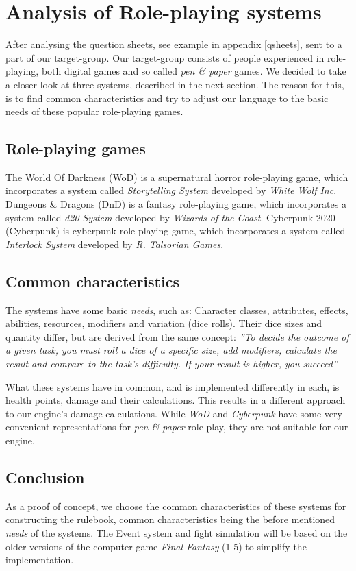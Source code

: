\section{Analysis of Role-playing systems}
After analysing the question sheets, see example in appendix \vref{qsheets}, sent to a part of our target-group. Our target-group consists of people experienced in role-playing, both digital games and so called \emph{pen \& paper} games. We decided to take a closer look at three systems, described in the next section. The reason for this, is to find common characteristics and try to adjust our language to the basic needs of these popular role-playing games.

\subsection*{Role-playing games}
The World Of Darkness (WoD) is a supernatural horror role-playing game, which incorporates a system called \emph{Storytelling System} developed by \emph{White Wolf Inc}.
Dungeons \& Dragons (DnD) is a fantasy role-playing game, which incorporates a system called \emph{d20 System} developed by \emph{Wizards of the Coast}.
Cyberpunk 2020 (Cyberpunk) is cyberpunk role-playing game, which incorporates a system called \emph{Interlock System} developed by \emph{R. Talsorian Games}.

\subsection*{Common characteristics}
The systems have some basic \emph{needs}, such as:
Character classes, attributes, effects, abilities, resources, modifiers and variation (dice rolls).
Their dice sizes and quantity differ, but are derived from the same concept: \textit{''To decide the outcome of a given task, you must roll a dice of a specific size, add modifiers, calculate the result and compare to the task's difficulty. If your result is higher, you succeed''}

What these systems have in common, and is implemented differently in each, is health points, damage and their calculations. This results in a different approach to our engine's damage calculations. While \emph{WoD} and \emph{Cyberpunk} have some very convenient representations for \emph{pen \& paper} role-play, they are not suitable for our engine.

\subsection*{Conclusion}
As a proof of concept, we choose the common characteristics of these systems for constructing the rulebook, common characteristics being the before mentioned \emph{needs} of the systems.
The Event system and fight simulation will be based on the older versions of the computer game \emph{Final Fantasy} (1-5) to simplify the implementation.


